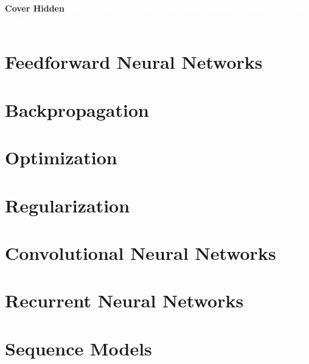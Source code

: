 \documentclass[11pt,fleqn,oneside]{book} %
\newcommand{\AUTHOR}{Federico Brancasi, Jacopo Manenti}
\newcommand{\DATE}{\today}
\newcommand{\VERSION}{1.0}
\newcommand{\TITLE}{Deep Learning}
\newcommand{\SUBTITLE}{University of Trento}
\renewcommand{\coverpage}[5]{{\Huge\textbf{Cover Hidden}}
    \textcolor{white}{#1, #2, #3, #4, #5}}
\begin{document}

\coverpage{\TITLE}{\SUBTITLE}{\AUTHOR}{\DATE}{\VERSION}

\newpage
\tableofcontents


\newpage
\chapter{Feedforward Neural Networks} 


\newpage
\chapter{Backpropagation} 


\newpage
\chapter{Optimization}


\newpage
\chapter{Regularization}


\newpage
\chapter{Convolutional Neural Networks}


\newpage
\chapter{Recurrent Neural Networks}


\newpage
\chapter{Sequence Models}

\end{document}
